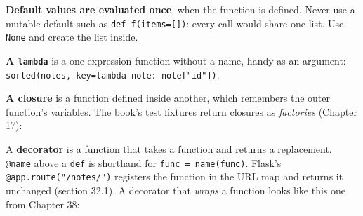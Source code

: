 \noindent{}\textbf{Default values are evaluated once}, when the function is defined. Never use a mutable default such as \texttt{def\ f(items={[}{]})}: every call would share one list. Use \texttt{None} and create the list inside.

\textbf{A \texttt{lambda}} is a one-expression function without a name, handy as an argument: \texttt{sorted(notes,}\allowbreak{}\texttt{\ key=}\allowbreak{}\texttt{lambda\ note:}\allowbreak{}\texttt{\ note{[}"id"{]})}.

\textbf{A closure} is a function defined inside another, which remembers the outer function's variables. The book's test fixtures return closures as \emph{factories} (Chapter 17):

\begin{codebox}[short]

\begin{Shaded}
\begin{Highlighting}[]
\OperatorTok{=} 

    \OperatorTok{{-}\textgreater{}} \NormalTok{:}
\OperatorTok{+=} 



\OperatorTok{=}
\end{Highlighting}
\end{Shaded}

\end{codebox}

\label{44-appendices:g3-decorators}

A \textbf{decorator} is a function that takes a function and returns a replacement. \texttt{@name} above a \texttt{def} is shorthand for \texttt{func\ =\ name(func)}. Flask's \texttt{@app.route("/}\allowbreak{}\texttt{notes/}\allowbreak{}\texttt{")} registers the function in the URL map and returns it unchanged (section 32.1). A decorator that \emph{wraps} a function looks like this one from Chapter 38:

